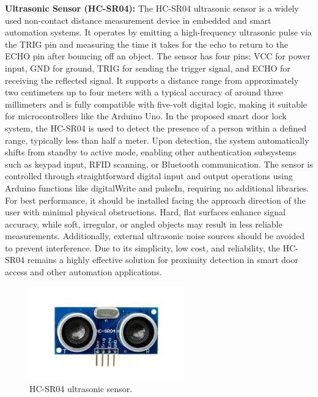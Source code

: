 \documentclass[conference, onecolumn]{IEEEtran}
\begin{document}
 \textbf{Ultrasonic Sensor (HC-SR04):} The HC-SR04 ultrasonic sensor is a widely used non-contact distance measurement device in embedded and smart automation systems. It operates by emitting a high-frequency ultrasonic pulse via the TRIG pin and measuring the time it takes for the echo to return to the ECHO pin after bouncing off an object. The sensor has four pins: VCC for power input, GND for ground, TRIG for sending the trigger signal, and ECHO for receiving the reflected signal. It supports a distance range from approximately two centimeters up to four meters with a typical accuracy of around three millimeters and is fully compatible with five-volt digital logic, making it suitable for microcontrollers like the Arduino Uno. In the proposed smart door lock system, the HC-SR04 is used to detect the presence of a person within a defined range, typically less than half a meter. Upon detection, the system automatically shifts from standby to active mode, enabling other authentication subsystems such as keypad input, RFID scanning, or Bluetooth communication. The sensor is controlled through straightforward digital input and output operations using Arduino functions like digitalWrite and pulseIn, requiring no additional libraries. For best performance, it should be installed facing the approach direction of the user with minimal physical obstructions. Hard, flat surfaces enhance signal accuracy, while soft, irregular, or angled objects may result in less reliable measurements. Additionally, external ultrasonic noise sources should be avoided to prevent interference. Due to its simplicity, low cost, and reliability, the HC-SR04 remains a highly effective solution for proximity detection in smart door access and other automation applications.

\begin{figure}[H]
	\centering
	\includegraphics[width=0.6\textwidth]{Ultrasonic_sensor.pdf}
	\caption{HC-SR04 ultrasonic sensor.}
	\label{fig4}
\end{figure}
\end{document}
